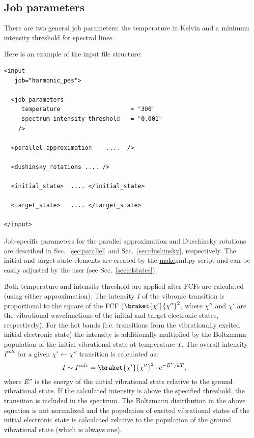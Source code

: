 \documentclass[11pt]{article}
\begin{document}
\subsection{Job parameters}
\label{sec:parameters}

There are two general job parameters: the temperature in Kelvin 
and a minimum intensity threshold for spectral lines.

Here is an example of the input file structure:
\begin{lstlisting}[frame=single,framerule=0pt]
<input 
   job="harmonic_pes">

  <job_parameters 
     temperature                    = "300"
     spectrum_intensity_threshold   = "0.001"
    />

  <parallel_approximation    ....  />

  <dushinsky_rotations .... />

  <initial_state>  .... </initial_state>

  <target_state>   .... </target_state>

</input>
\end{lstlisting}

Job-specific parameters for the parallel approximation and Duschinsky rotations are described
in Sec.~\ref{sec:parallel} and Sec.~\ref{sec:dushinsky}, respectively. The initial and target state elements are created 
by the \ul{make}{xml.py} script and can be easily adjusted by the user (see Sec.~\ref{sec:elstates}).

Both temperature and intensity threshold are applied after FCFs are calculated
(using either approximation).
The intensity $I$ of the vibronic transition is proportional to the square of the FCF 
($\braket{\chi '}{\chi''}^2$, where $\chi''$ and $\chi '$ are the 
vibrational wavefunctions of the initial and target electronic states, respectively).
For the hot bands (i.e. transitions from the vibrationally excited initial electronic state) 
the intensity is additionally multiplied by the Boltzmann population of the
initial vibrational state at temperature $T$. 
The overall intensity $I^{calc}$ for a given $\chi ' \leftarrow \chi''$ transition
is calculated as:
\begin{align}
I\sim I^{calc}&=\braket{\chi '}{\chi''}^2\cdot e^{-E''/kT},
\label{eq:intens}
\end{align}
where $E''$ is the energy of the initial vibrational state relative to the ground vibrational state.
If the calculated intensity is above the specified threshold, the transition is included in the spectrum.
The Boltzmann distribution in the above equation is not normalized and the population of excited vibrational
states of the initial electronic state is calculated relative to the population of the ground vibrational
state (which is always one). 
\end{document}
